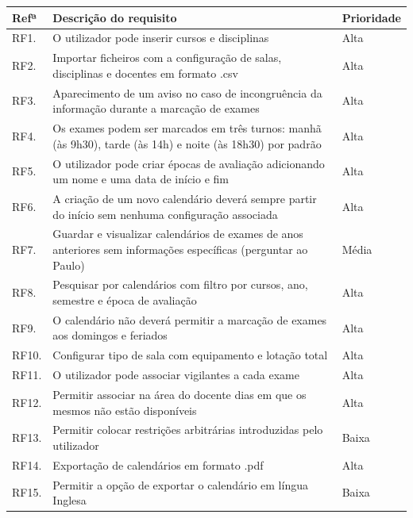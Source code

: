 \documentclass[11pt, twoside]{report}
\begin{document}
	
	
\def\arraystretch{1.5}%
	\begin{center}
		
		\begin{longtable}{|m{1cm}|m{12cm}|m{2cm}|}
			
			
			\hline			
			\textbf{Refª }	& \textbf{Descrição do requisito} & \textbf{Prioridade} \\
			\hline
			RF1. & O utilizador pode inserir cursos e disciplinas & Alta\\
			\hline
			RF2. & Importar ficheiros com a configuração de salas, disciplinas e docentes em formato .csv & Alta \\
			\hline
			RF3. & Aparecimento de um aviso no caso de incongruência da informação durante a marcação de exames & Alta \\
			\hline
			RF4. & Os exames podem ser marcados em três turnos: manhã (às 9h30), tarde (às 14h) e noite (às 18h30) por padrão & Alta \\
			\hline
			RF5. & O utilizador pode criar épocas de avaliação adicionando um nome e uma data de início e fim & Alta \\
			\hline
			RF6. & A criação de um novo calendário deverá sempre partir do início sem nenhuma configuração associada & Alta\\
			\hline
			RF7. & Guardar e visualizar calendários de exames de anos anteriores sem informações específicas (perguntar ao Paulo) & Média \\
			\hline
			RF8.  & Pesquisar por calendários com filtro por cursos, ano, semestre e época de avaliação  & Alta \\
			\hline
			RF9. & O calendário não deverá permitir a marcação de exames aos domingos e feriados & Alta \\
			\hline
			RF10. & Configurar tipo de sala com equipamento e lotação total & Alta \\
			\hline
			RF11. & O utilizador pode associar vigilantes a cada exame & Alta \\
			\hline
			RF12. & Permitir associar na área do docente dias em que os mesmos não estão disponíveis & Alta\\
			\hline
			RF13. & Permitir colocar restrições arbitrárias introduzidas pelo utilizador & Baixa \\
			\hline
			RF14. & Exportação de calendários em formato .pdf & Alta \\
			\hline
			RF15. & Permitir a opção de exportar o calendário em língua Inglesa & Baixa \\

\end{longtable}
\end{center}
\end{document}
